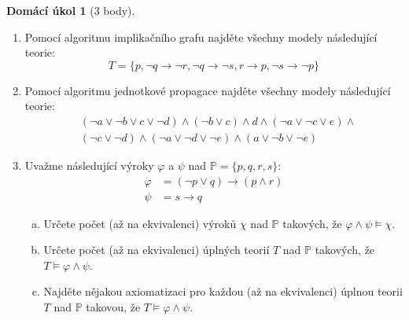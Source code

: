 \documentclass[a4paper]{article}
\theoremstyle{definition}
\newtheorem*{ukol}{Domácí úkol}
\begin{document}
\medskip\begin{ukol}[3 body]
\begin{enumerate}[1.]
\item Pomocí algoritmu implikačního grafu najděte všechny modely následující teorie:
$$
T=\{p,\neg q \to \neg r,\neg q \to \neg s,r \to p,\neg s \to \neg p\}
$$

\item Pomocí algoritmu jednotkové propagace najděte všechny modely následující teorie:
\begin{align*}
    &(\neg a \vee \neg b \vee c \vee \neg d)\wedge(\neg b \vee c)\wedge d \wedge (\neg a \vee \neg c \vee e)\wedge \\
    &(\neg c \vee \neg d)\wedge(\neg a \vee \neg d \vee \neg e)\wedge(a\vee \neg b \vee\neg e)
\end{align*}

\item Uvažme následující výroky $\varphi$ a $\psi$ nad $\mathbb P=\{p, q, r, s\}$:
\begin{align*}
    \varphi &= (\neg p \vee  q)\to(p\wedge r)\\
    \psi &= s\to q
\end{align*}
\begin{enumerate}[(a)]
    \item Určete počet (až na ekvivalenci) výroků $\chi$ nad $\mathbb P$ takových, že $\varphi\wedge\psi\models\chi$.
    \item Určete počet (až na ekvivalenci) úplných teorií $T$ nad $\mathbb P$ takových, že $T\models\varphi\wedge\psi$.
    \item Najděte nějakou axiomatizaci pro každou (až na ekvivalenci) úplnou teorii $T$ nad $\mathbb P$ takovou, že $T\models\varphi\wedge\psi$.
\end{enumerate}
\end{enumerate} 
\end{ukol}
\end{document}
